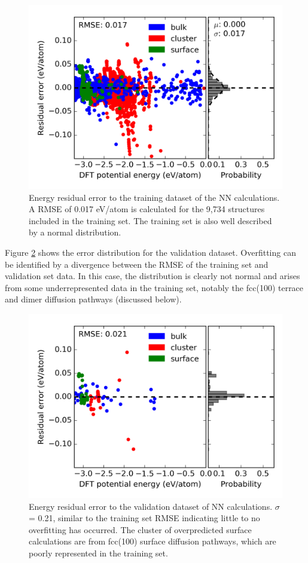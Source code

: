 \documentclass[12pt,oneside]{cmuthesis}
\begin{document}
\begin{figure}[h]
\centering
\includegraphics[width=5.5in]{./images/fig-neural-train.png}
\caption{\label{fig-neural-train}
Energy residual error to the training dataset of the NN calculations. A RMSE of 0.017 eV/atom is calculated for the 9,734 structures included in the training set. The training set is also well described by a normal distribution.}
\end{figure}

Figure \ref{fig-neural-valid} shows the error distribution for the validation dataset. Overfitting can be identified by a divergence between the RMSE of the training set and validation set data. In this case, the distribution is clearly not normal and arises from some underrepresented data in the training set, notably the fcc(100) terrace and dimer diffusion pathways (discussed below).

\begin{figure}[h]
\centering
\includegraphics[width=5.5in]{./images/fig-neural-valid.png}
\caption{\label{fig-neural-valid}
Energy residual error to the validation dataset of NN calculations. \(\sigma\) = 0.21, similar to the training set RMSE indicating little to no overfitting has occurred. The cluster of overpredicted surface calculations are from fcc(100) surface diffusion pathways, which are poorly represented in the training set.}
\end{figure}
\end{document}
